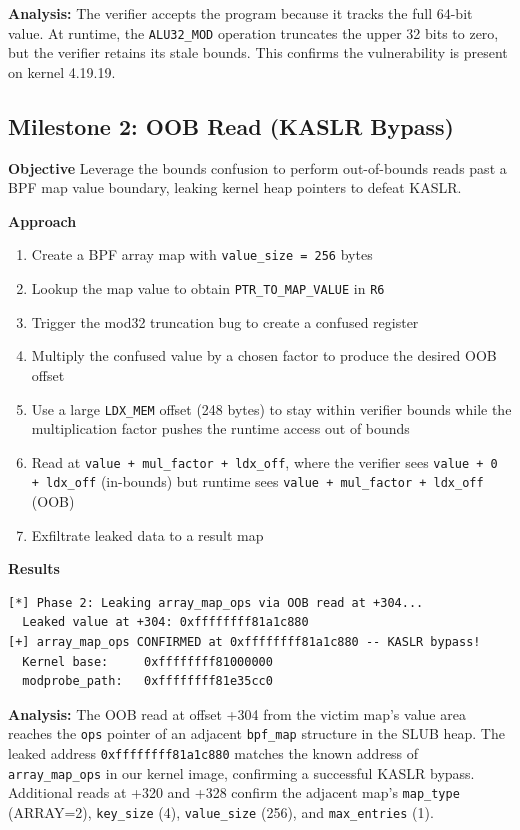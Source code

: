 \textbf{Analysis:} The verifier accepts the program because it tracks the full 64-bit value. At runtime, the \texttt{ALU32\_MOD} operation truncates the upper 32 bits to zero, but the verifier retains its stale bounds. This confirms the vulnerability is present on kernel 4.19.19.


\subsection{Milestone 2: OOB Read (KASLR Bypass)}

\textbf{Objective}
Leverage the bounds confusion to perform out-of-bounds reads past a BPF map value boundary, leaking kernel heap pointers to defeat KASLR.

\textbf{Approach}

\begin{enumerate}
    \item Create a BPF array map with \texttt{value\_size = 256} bytes
    \item Lookup the map value to obtain \texttt{PTR\_TO\_MAP\_VALUE} in \texttt{R6}
    \item Trigger the mod32 truncation bug to create a confused register
    \item Multiply the confused value by a chosen factor to produce the desired OOB offset
    \item Use a large \texttt{LDX\_MEM} offset (248 bytes) to stay within verifier bounds while the multiplication factor pushes the runtime access out of bounds
    \item Read at \texttt{value + mul\_factor + ldx\_off}, where the verifier sees \texttt{value + 0 + ldx\_off} (in-bounds) but runtime sees \texttt{value + mul\_factor + ldx\_off} (OOB)
    \item Exfiltrate leaked data to a result map
\end{enumerate}

\textbf{Results}

\begin{lstlisting}[style=log,caption={Milestone 2: OOB read leaking array\_map\_ops on kernel 4.19.19}]
[*] Phase 2: Leaking array_map_ops via OOB read at +304...
  Leaked value at +304: 0xffffffff81a1c880
[+] array_map_ops CONFIRMED at 0xffffffff81a1c880 -- KASLR bypass!
  Kernel base:     0xffffffff81000000
  modprobe_path:   0xffffffff81e35cc0
\end{lstlisting}

\textbf{Analysis:} The OOB read at offset +304 from the victim map's value area reaches the \texttt{ops} pointer of an adjacent \texttt{bpf\_map} structure in the SLUB heap. The leaked address \texttt{0xffffffff81a1c880} matches the known address of \texttt{array\_map\_ops} in our kernel image, confirming a successful KASLR bypass. Additional reads at +320 and +328 confirm the adjacent map's \texttt{map\_type} (ARRAY=2), \texttt{key\_size} (4), \texttt{value\_size} (256), and \texttt{max\_entries} (1).


